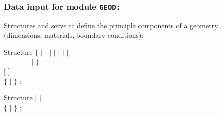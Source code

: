 \vskip 0.2cm

\subsubsection{Data input for module {\tt GEOD:}}\label{sect:geo_data1}

Structures  and  serve to define the
principle components of a geometry (dimensions, materials, boundary
conditions):

\begin{DataStructure}{Structure }
$\{$  $|$   $|$   $|$ 
  $|$    $|$    $|$     $|$ \\
~~~~~~   $|$    $|$   $\}$ \\
$[$   $]$ \\
$\{$    $|$  $\}$
;
\end{DataStructure}

\begin{DataStructure}{Structure }
$[$   $]$ \\
$\{$    $|$  $\}$
;
\end{DataStructure}

\noindent

